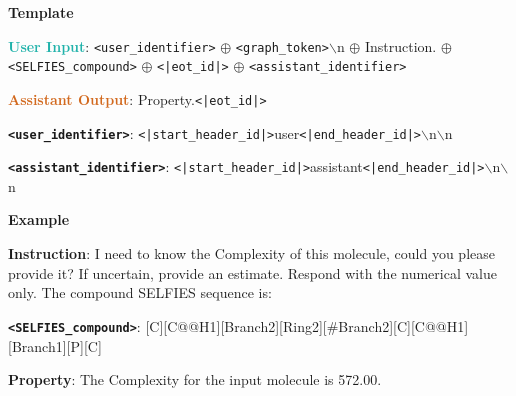 \begin{tcolorbox}[colback=white!98!black,colframe=white!30!black,boxsep=1.1pt,top=6.75pt]%
\vspace{1.75pt}%
\scriptsize
\noindent\makebox[\textwidth]{\rule{\textwidth}{1pt}}
\textbf{Template}
\\[-0.575em]
\noindent\makebox[\textwidth]{\rule{\textwidth}{1pt}}

\textbf{\textcolor[HTML]{20B2AA}{User Input}}: {\tt <user\_identifier>} $\oplus$ {\tt <graph\_token>}$\backslash$n $\oplus$ Instruction. $\oplus$ {\tt <SELFIES\_compound>} $\oplus$ {\tt <|eot\_id|>} $\oplus$ {\tt <assistant\_identifier>}

\textbf{\textcolor[HTML]{D2691E}{Assistant Output}}: Property.{\tt <|eot\_id|>}

{\tt \textbf{<user\_identifier>}}: {\tt <|start\_header\_id|>}user{\tt <|end\_header\_id|>}$\backslash$n$\backslash$n

{\tt \textbf{<assistant\_identifier>}}: {\tt <|start\_header\_id|>}assistant{\tt <|end\_header\_id|>}$\backslash$n$\backslash$n

\noindent\makebox[\textwidth]{\rule{\textwidth}{1pt}}
\textbf{Example}
\\[-0.575em]
\noindent\makebox[\textwidth]{\rule{\textwidth}{1pt}}

\begin{tcolorbox}[colback=cyan!7!white,colframe=white!98!black,boxsep=1.1pt,top=6.75pt]
\textbf{Instruction}: I need to know the Complexity of this molecule, could you please provide it? If uncertain, provide an estimate. Respond with the numerical value only. The compound SELFIES sequence is:

{\tt \textbf{<SELFIES\_compound>}}: [C][C@@H1][Branch2][Ring2][\#Branch2][C][C@@H1][Branch1][P][C]\-[=Branch1][C][=O][N][C@@H1][Branch1][C][C][C] [=N][C][=C][S][Ring1][Branch1][N][Branch1][C][C][C]\-[=Branch1][C][=O][C][C@H1][Branch1][C][C][C][Branch1][C][Cl][Branch1][C][Cl][Cl] [C][Branch1][C][Cl]\-[Branch1][C][Cl][Cl]

\end{tcolorbox}

\begin{tcolorbox}[colback=orange!7!white,colframe=white!98!black,boxsep=1.1pt,top=6.75pt]
\textbf{Property}: The Complexity for the input molecule is 572.00.
\end{tcolorbox}

\end{tcolorbox}


